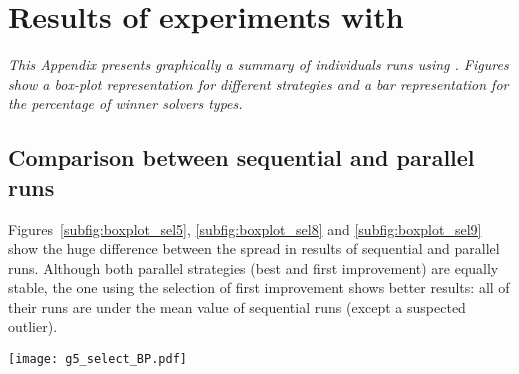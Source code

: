 \chapter{Results of experiments with \sgp}
\label{app:sgp}
\textit{This Appendix presents graphically a summary of individuals runs using \sgp. Figures show a \textit{box-plot} representation for different strategies and a bar representation for the percentage of winner solvers types.}

\vspace{2ex}\vfill
\minitoc
\newpage

\section{Comparison between sequential and parallel runs}

%

\begin{minipage}[c]{0.50\textwidth}
Figures~\ref{subfig:boxplot_sel5}, \ref{subfig:boxplot_sel8} and \ref{subfig:boxplot_sel9} show the huge difference between the spread in results of sequential and parallel runs. Although both parallel strategies (best and first improvement) are equally stable, the one using the selection \om{} of first improvement shows better results: all of their runs are under the mean value of sequential runs (except a suspected outlier).
\end{minipage}\hspace{0.05\textwidth}
\begin{minipage}[c]{0.40\textwidth}
\centering
\texttt{[image: g5\_select\_BP.pdf]}
\label{subfig:boxplot_sel5}
\end{minipage}


